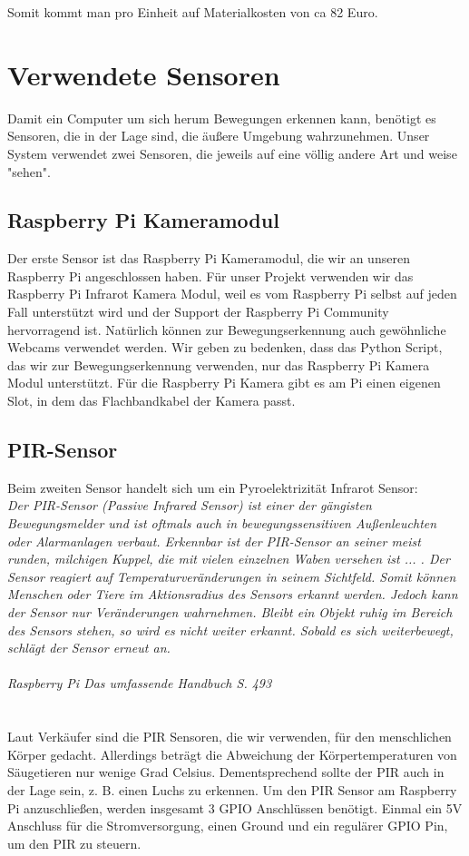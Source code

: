 \documentclass[12pt,a4paper]{scrreprt}
\begin{document}
Somit kommt man pro Einheit auf Materialkosten von ca 82 Euro.

\section{Verwendete Sensoren}
Damit ein Computer um sich herum Bewegungen erkennen kann, benötigt es Sensoren, die in der Lage sind, die äußere Umgebung wahrzunehmen. Unser System verwendet zwei Sensoren, die jeweils auf eine völlig andere Art und weise "sehen".


\subsection{Raspberry Pi Kameramodul}
Der erste Sensor ist das Raspberry Pi Kameramodul, die wir an unseren Raspberry Pi angeschlossen haben. Für unser Projekt verwenden wir das Raspberry Pi Infrarot Kamera Modul, weil es vom Raspberry Pi selbst auf jeden Fall unterstützt wird und der Support der Raspberry Pi Community hervorragend ist. Natürlich können zur Bewegungserkennung auch gewöhnliche Webcams verwendet werden. Wir geben zu bedenken, dass das Python Script, das wir zur Bewegungserkennung verwenden, nur das Raspberry Pi Kamera Modul unterstützt.
Für die Raspberry Pi Kamera gibt es am Pi einen eigenen Slot, in dem das Flachbandkabel der Kamera passt.

\subsection{PIR-Sensor}
Beim zweiten Sensor handelt sich um ein Pyroelektrizität Infrarot Sensor:\\
\textit{Der PIR-Sensor (Passive Infrared Sensor) ist einer der gängisten Bewegungsmelder
und ist oftmals auch in bewegungssensitiven Außenleuchten oder Alarmanlagen verbaut.
Erkennbar ist der PIR-Sensor an seiner meist runden, milchigen Kuppel, die mit
vielen einzelnen Waben versehen ist ... . Der Sensor reagiert auf
Temperaturveränderungen in seinem Sichtfeld. Somit können Menschen oder Tiere
im Aktionsradius des Sensors erkannt werden. Jedoch kann der Sensor nur Veränderungen
wahrnehmen. Bleibt ein Objekt ruhig im Bereich des Sensors stehen, so wird
es nicht weiter erkannt. Sobald es sich weiterbewegt, schlägt der Sensor erneut an.}\\ \\
\textit{Raspberry Pi Das umfassende Handbuch S. 493}\\ \\ \\
Laut Verkäufer sind die PIR Sensoren, die wir verwenden, für den menschlichen Körper gedacht.
Allerdings beträgt die Abweichung der Körpertemperaturen von Säugetieren nur wenige Grad Celsius.
Dementsprechend sollte der PIR auch in der Lage sein, z. B. einen Luchs zu erkennen.
Um den PIR Sensor am Raspberry Pi anzuschließen, werden insgesamt 3 GPIO Anschlüssen benötigt.
Einmal ein 5V Anschluss für die Stromversorgung, einen Ground und ein regulärer GPIO Pin, um den PIR zu steuern.
\end{document}
